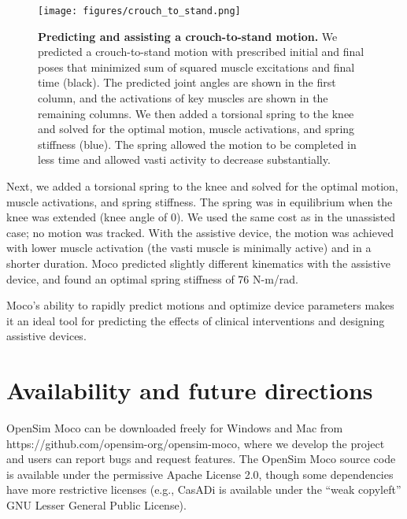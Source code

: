 \documentclass[10pt,letterpaper]{article}
\begin{document}
\begin{figure}[!h]
    \begin{adjustwidth}{-2.25in}{0in} %
        \centering
        \texttt{[image: figures/crouch\_to\_stand.png]}
        \caption{{\bf Predicting and assisting a crouch-to-stand motion.}
We predicted a crouch-to-stand motion with prescribed initial and final poses that minimized sum of squared muscle excitations and final time (black). The predicted joint angles are shown in the first column, and the activations of key muscles are shown in the remaining columns. We then added a torsional spring to the knee and solved for the optimal motion, muscle activations, and spring stiffness (blue). The spring allowed the motion to be completed in less time and allowed vasti activity to decrease substantially.}
        \label{crouchtostand}
    \end{adjustwidth}
\end{figure}

Next, we added a torsional spring to the knee and solved for the optimal motion, muscle activations, and spring stiffness. The spring was in equilibrium when the knee was extended (knee angle of 0). We used the same cost as in the unassisted case; no motion was tracked. With the assistive device, the motion was achieved with lower muscle activation (the vasti muscle is minimally active) and in a shorter duration. Moco predicted slightly different kinematics with the assistive device, and found an optimal spring stiffness of 76 N-m/rad.

Moco’s ability to rapidly predict motions and optimize device parameters makes it an ideal tool for predicting the effects of clinical interventions and designing assistive devices.


\section*{Availability and future directions}

OpenSim Moco can be downloaded freely for Windows and Mac from https://github.com/opensim-org/opensim-moco, where we develop the project and users can report bugs and request features. The OpenSim Moco source code is available under the permissive Apache License 2.0, though some dependencies have more restrictive licenses (e.g., CasADi is available under the “weak copyleft” GNU Lesser General Public License).
\end{document}
